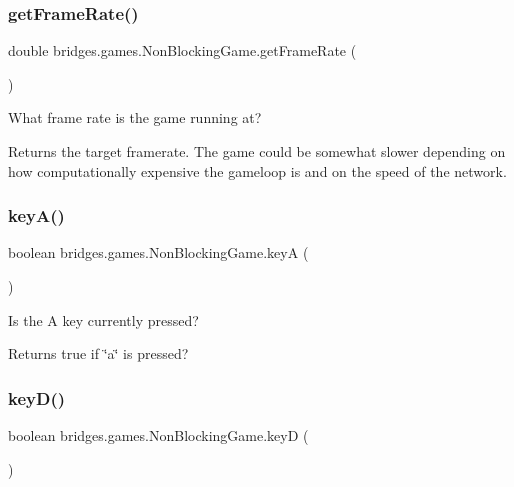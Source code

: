 \subsubsection{\texorpdfstring{get\+Frame\+Rate()}{getFrameRate()}}
{\footnotesize\ttfamily double bridges.\+games.\+Non\+Blocking\+Game.\+get\+Frame\+Rate (\begin{DoxyParamCaption}{ }\end{DoxyParamCaption})\hspace{0.3cm}{\ttfamily [protected]}}



What frame rate is the game running at? 

\begin{DoxyReturn}{Returns}
the target framerate. The game could be somewhat slower depending on how computationally expensive the gameloop is and on the speed of the network. 
\end{DoxyReturn}
\mbox{\label{classbridges_1_1games_1_1_non_blocking_game_a4328a21ca65c26e11161dfe362770917}} 
\subsubsection{\texorpdfstring{key\+A()}{keyA()}}
{\footnotesize\ttfamily boolean bridges.\+games.\+Non\+Blocking\+Game.\+keyA (\begin{DoxyParamCaption}{ }\end{DoxyParamCaption})\hspace{0.3cm}{\ttfamily [protected]}}



Is the A key currently pressed? 

\begin{DoxyReturn}{Returns}
true if \char`\"{}a\char`\"{} is pressed? 
\end{DoxyReturn}
\mbox{\label{classbridges_1_1games_1_1_non_blocking_game_a830a2e8127b042f8915deb61f0038f2a}} 
\subsubsection{\texorpdfstring{key\+D()}{keyD()}}
{\footnotesize\ttfamily boolean bridges.\+games.\+Non\+Blocking\+Game.\+keyD (\begin{DoxyParamCaption}{ }\end{DoxyParamCaption})\hspace{0.3cm}{\ttfamily [protected]}}



